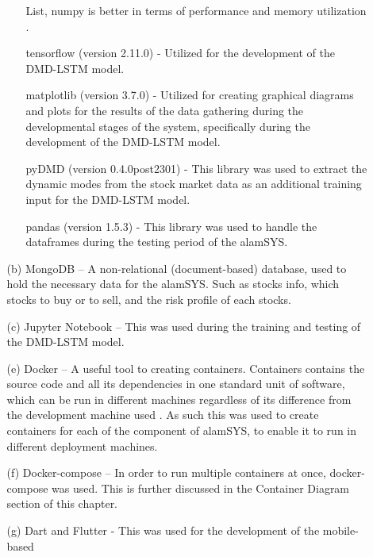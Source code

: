 \begin{itemize}
\begin{itemize}
\begin{itemize}
                    List, numpy is better in terms of performance 
                    and memory utilization 
                    \cite{GeekforGeeks_numpyVSlist}.
                    \item[\ding{109}] tensorflow (version 2.11.0) - Utilized for the development of 
                    the DMD-LSTM model.
                    \item[\ding{109}] matplotlib (version 3.7.0) - Utilized for creating 
                    graphical diagrams and plots for the results of the data 
                    gathering during the developmental stages of the system, 
                    specifically during the development of the DMD-LSTM model.
                    \item[\ding{109}] pyDMD (version 0.4.0post2301) - This library was used to extract 
                    the dynamic modes from the stock market data as an additional 
                    training input for the DMD-LSTM model.
                    \item[\ding{109}] pandas (version 1.5.3) - This library was used to 
                    handle the dataframes during the testing period of the alamSYS.
                \end{itemize}
            \item[(b)] MongoDB – A non-relational (document-based) database, 
            used to hold the necessary data for the alamSYS. Such as stocks info, which stocks to buy or to sell, 
            and the risk profile of each stocks.
            \item[(c)] Jupyter Notebook – This was used during the training and testing of 
            the DMD-LSTM model.
            \item[(e)] Docker – A useful tool to creating containers.
            Containers contains the source code and all its dependencies in one standard unit of software, 
            which can be run in different machines regardless of its difference from the development machine 
            used \cite{Docker}.
            As such this was used to create containers for each of the component of alamSYS, 
            to enable it to run in different deployment machines.
            \item[(f)] Docker-compose – In order to run multiple containers at once, 
            docker-compose was used. This is further discussed in the Container Diagram 
            section of this chapter.
            \item[(g)] Dart and Flutter - This was used for the development of the mobile-based 

\end{itemize}
\end{itemize}
